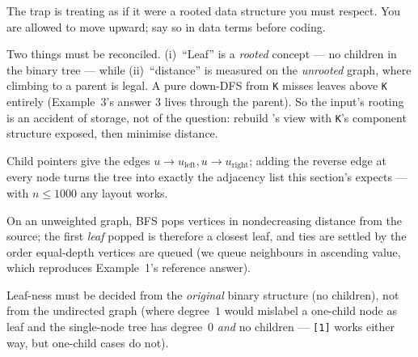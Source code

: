 \begin{attemptgate}
The trap is treating  as if it were a rooted data structure you must
respect. You are allowed to move upward; say so in data terms before coding.
\end{attemptgate}

Two things must be reconciled. (i)~``Leaf'' is a \emph{rooted} concept --- no children in
the binary tree --- while (ii)~``distance'' is measured on the \emph{unrooted} graph,
where climbing to a parent is legal. A pure down-DFS from \texttt{K} misses leaves above
\texttt{K} entirely (Example~3's answer $3$ lives through the parent). So the input's
rooting is an accident of storage, not of the question: rebuild 's
view with \texttt{K}'s component structure exposed, then minimise distance.

\begin{observation}
Child pointers give the edges $u\!\to\!u_\text{left},u\!\to\!u_\text{right}$; adding the
reverse edge at every node turns the tree into exactly the adjacency list this section's
 expects --- with $n \le 1000$ any layout works.
\end{observation}
\begin{observation}
On an unweighted graph, BFS pops vertices in nondecreasing distance from the source; the
first \emph{leaf} popped is therefore a closest leaf, and ties are settled by the order
equal-depth vertices are queued (we queue neighbours in ascending value, which reproduces
Example~1's reference answer).
\end{observation}
\begin{observation}
Leaf-ness must be decided from the \emph{original} binary structure (no children), not
from the undirected graph (where degree~$1$ would mislabel a one-child node as leaf and
the single-node tree has degree~$0$ \emph{and} no children --- \texttt{[1]} works either
way, but one-child cases do not).
\end{observation}

